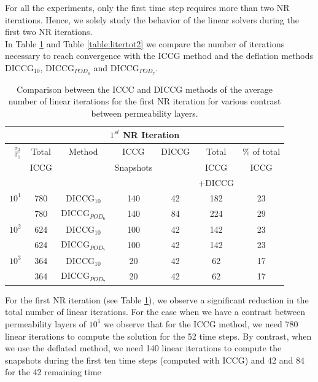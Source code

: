 \documentclass[review]{elsarticle}
\begin{document}
For all the experiments, only the first time step requires more than two NR iterations. Hence, we solely study the behavior of the linear solvers during the first two NR iterations. \\
In Table \ref{table:litertot1} and Table \ref{table:litertot2} we compare the number of iterations necessary to reach convergence with the ICCG method and the deflation methods DICCG$_{10}$, DICCG$_{POD_6}$ and DICCG$_{POD_7}$.\\

\begin{table}[!ht]\centering
\begin{minipage}{1\textwidth}
\vspace{-10pt}
\centering
\begin{tabular}{ ||c|c||c|c|c|c|c||} 

\hline
\multicolumn{7}{|c|}{$1^{st}$ NR Iteration}  \\
\hline\
$\frac{\sigma_2}{\sigma_1}$&Total& Method & ICCG&DICCG &Total&\% of total\\
                           &   ICCG   &  & Snapshots& &ICCG& ICCG\\
 &     &  & & &+DICCG& \\
\hline
$10^{1}$ &780&DICCG$_{10}$ & 140&42& 182&23\\
 &780& DICCG$_{POD_6}$&140&84&  224&29\\
 \hline
$10^{2}$  &624&DICCG$_{10}$ &100&42&  142&23\\
          &624&DICCG$_{POD_7}$&100&42& 142 &23\\
          \hline
 $10^{3}$ &364&DICCG$_{10}$ &20&42  &62& 17\\
          &364&DICCG$_{POD_7}$&20&42&  62&17 \\
 \hline
 \end{tabular}
\caption{Comparison between the ICCC and DICCG methods of the average number of linear iterations for the first NR iteration for various contrast between permeability layers. }\label{table:litertot1}
\end{minipage}
\end{table}
For the first NR iteration (see Table \ref{table:litertot1}), we observe a significant reduction in the total number of linear iterations. 
For the case when we have a contrast between permeability layers of $10^{1}$ we observe that for the ICCG method, we need 780 linear iterations to compute the solution for the 52 time steps. By contrast, when we use the deflated method, we need 140 
linear iterations to compute the snapshots during the first ten time steps (computed with ICCG) and 42 and 84 for the 42 remaining time 
\end{document}
